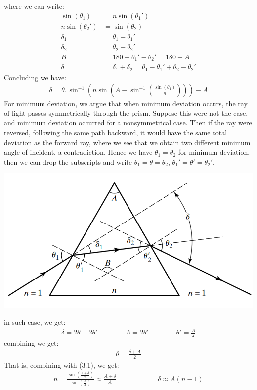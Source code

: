\documentclass[11pt]{book}
\theoremstyle{break}
\theoremstyle{break}
\begin{document}
where we can write:
\begin{align*}
\sin(\theta_1) &= n\sin(\theta_1')\\
n\sin(\theta_2') &= \sin(\theta_2) \\
\delta_1 &= \theta_1 - \theta_1'\\
\delta_2 &= \theta_2 - \theta_2'\\
B &= 180 - \theta_1' - \theta_2' = 180-A\\
\delta &= \delta_1 + \delta_2 = \theta_1 - \theta_1' + \theta_2 - \theta_2'
\end{align*}
Concluding we have:
\begin{align}
\delta = \theta_1 \sin^{-1}\left( n \sin\left(A-\sin^{-1}\left( \frac{\sin(\theta_1)}{n}\right) \right)\right) - A
\end{align}
For minimum deviation, we argue that when minimum deviation occurs, the ray of light passes symmetrically through the prism. Suppose this were not the case, and minimum deviation occurred for a nonsymmetrical case. Then if the ray were reversed, following the same path backward, it would have the same total deviation as the forward ray, where we see that we obtain two different minimum angle of incident, a contradiction. Hence we have $\theta_1 = \theta_2$ for minimum deviation, then we can drop the subscripts and write $\theta_1 = \theta = \theta_2$, $\theta_1' = \theta' = \theta_2'$.
\begin{center}
\includegraphics[scale=0.45]{prism.png}
\end{center}
in such case, we get:
\begin{align*}
\delta = 2\theta - 2\theta' \qquad \qquad A = 2\theta' \qquad\qquad \theta' = \frac{A}{2}
\end{align*}
combining we get:
\begin{align*}
\theta = \frac{\delta +A}{2}
\end{align*}
That is, combining with (3.1), we get:
\begin{align*}
n = \frac{\sin\left( \frac{A+\delta}{2}\right)}{\sin\left( \frac{A}{2}\right) }\approx \frac{A+\delta}{A} \qquad\qquad\qquad \delta \approx A(n-1)
\end{align*}
\end{document}

